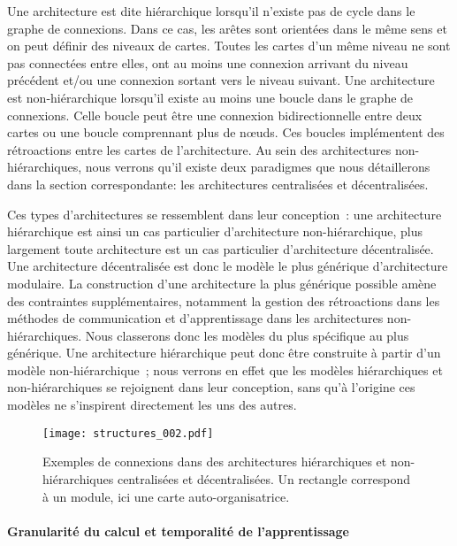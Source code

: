 \documentclass[../main]{subfiles}
\begin{document}
Une architecture est dite hiérarchique lorsqu'il n'existe pas de cycle dans le graphe de connexions. Dans ce cas, les arêtes sont orientées dans le même sens et on peut définir des niveaux de cartes. Toutes les cartes d'un même niveau ne sont pas connectées entre elles, ont au moins une connexion arrivant du niveau précédent et/ou une connexion sortant vers le niveau suivant.
Une architecture est non-hiérarchique lorsqu'il existe au moins une boucle dans le graphe de connexions. Celle boucle peut être une connexion bidirectionnelle entre deux cartes ou une boucle comprennant plus de n\oe{}uds. Ces boucles implémentent des rétroactions entre les cartes de l'architecture.
Au sein des architectures non-hiérarchiques, nous verrons qu'il existe deux paradigmes que nous détaillerons dans la section correspondante: les architectures centralisées et décentralisées.


Ces types d'architectures se ressemblent dans leur conception~: une architecture hiérarchique est ainsi un cas particulier d'architecture non-hiérarchique, plus largement toute architecture est un cas particulier d'architecture décentralisée. Une architecture décentralisée est donc le modèle le plus générique d'architecture modulaire. 
La construction d'une architecture la plus générique possible amène des contraintes supplémentaires, notamment la gestion des rétroactions dans les méthodes de communication et d'apprentissage dans les architectures non-hiérarchiques. Nous classerons donc les modèles du plus spécifique au plus générique. Une architecture hiérarchique peut donc être construite à partir d'un modèle non-hiérarchique~; nous verrons en effet que les modèles hiérarchiques et non-hiérarchiques se rejoignent dans leur conception, sans qu'à l'origine ces modèles ne s'inspirent directement les uns des autres.

\begin{figure}
    \centering\texttt{[image: structures\_002.pdf]}
    \caption{Exemples de connexions dans des architectures hiérarchiques et non-hiérarchiques centralisées et décentralisées. Un rectangle correspond à un module, ici une carte auto-organisatrice. \label{fig:graphe}}
    \end{figure}

\paragraph{Granularité du calcul et temporalité de l'apprentissage}
\end{document}
